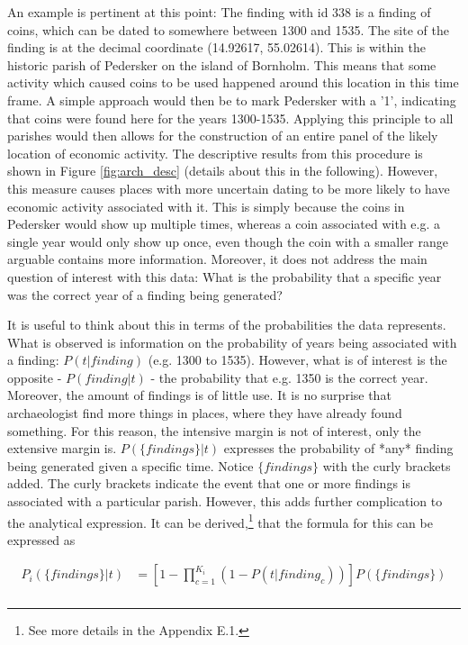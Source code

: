 \documentclass[11pt]{article}
\begin{document}
An example is pertinent at this point: The finding with id 338 is a finding of coins, which can be dated to somewhere between 1300 and 1535. The site of the finding is at the decimal coordinate (14.92617, 55.02614). This is within the historic parish of Pedersker on the island of Bornholm. This means that some activity which caused coins to be used happened around this location in this time frame. A simple approach would then be to mark Pedersker with a '1', indicating that coins were found here for the years 1300-1535. Applying this principle to all parishes would then allows for the construction of an entire panel of the likely location of economic activity. The descriptive results from this procedure is shown in Figure \ref{fig:arch_desc} (details about this in the following). However, this measure causes places with more uncertain dating to be more likely to have economic activity associated with it. This is simply because the coins in Pedersker would show up multiple times, whereas a coin associated with e.g. a single year would only show up once, even though the coin with a smaller range arguable contains more information. Moreover, it does not address the main question of interest with this data: What is the probability that a specific year was the correct year of a finding being generated?

It is useful to think about this in terms of the probabilities the data represents. What is observed is information on the probability of years being associated with a finding: $P(t|finding)$ (e.g. 1300 to 1535). However, what is of interest is the opposite - $P(finding|t)$ - the probability that e.g. 1350 is the correct year. Moreover, the amount of findings is of little use. It is no surprise that archaeologist find more things in places, where they have already found something. For this reason, the intensive margin is not of interest, only the extensive margin is. $P(\{findings\}|t)$ expresses the probability of *any* finding being generated given a specific time. Notice $\{findings\}$ with the curly brackets added. The curly brackets indicate the event that one or more findings is associated with a particular parish. However, this adds further complication to the analytical expression. It can be derived,\footnote{See more details in the Appendix E.1.} that the formula for this can be expressed as 

\begin{equation}
\begin{split}
\label{eq:arch1}
P_i(\{findings\}|t)&=\left[1-\prod_{c=1}^{K_i} \left( 1 - P(t|finding_c) \right)\right] P(\{findings\}) \\
\end{split}
\end{equation}
\end{document}
